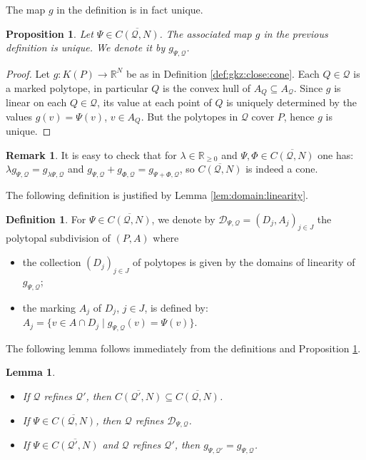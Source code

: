 \documentclass[12pt, a4article]{amsart}   	%
\numberwithin{equation}{section}
\theoremstyle{plain}
\newtheorem{proposition}[theorem]{Proposition}
\newtheorem{lemma}[theorem]{Lemma}
\theoremstyle{definition}
\newtheorem{remark}[theorem]{Remark}
\newtheorem{definition}[theorem]{Definition}
\newcommand{\R}{{\mathbb R}}
\newcommand{\mcD}{{\mathcal D}}
\newcommand{\mcQ}{{\mathcal Q}}
\begin{document}
The map $g$ in the definition is in fact unique.

\begin{proposition}\label{prp:unique:Q-linear}
Let $\Psi\in\overline{C(\mcQ,N)}$. The associated map $g$ in the previous definition is unique. 
We denote it by $g_{\Psi,\mcQ}$.
\end{proposition}

\begin{proof} 
Let $g:K(P)\to\R^N$ be as in Definition \ref{def:gkz:close:cone}. Each $Q\in\mcQ$ is a marked polytope, in particular $Q$ is the convex hull of $A_Q\subseteq A_\mcQ$. Since $g$ is linear on each $Q\in\mcQ$, its value at each point of $Q$ is uniquely determined by the values $g(v) = \Psi(v)$, 
$v\in A_Q$. But the polytopes in $\mcQ$ cover $P$, hence $g$ is unique.
\end{proof}
\begin{remark}\rm
It is easy to check that for $\lambda\in\mathbb R_{\ge 0}$
and $\Psi,\Phi\in \overline{C(\mcQ,N)}$ one has: $\lambda g_{\Psi,\mcQ}=g_{\lambda\Psi,\mcQ}$
and $g_{\Psi,\mcQ}+g_{\Phi,\mcQ}=g_{\Psi+\Phi,\mcQ}$, so $ \overline{C(\mcQ,N)}$ is indeed a cone.
\end{remark}
The following definition is justified by Lemma \ref{lem:domain:linearity}.

\begin{definition}\label{def:subdivision:matrix}
For $\Psi\in\overline{C(\mcQ,N)}$, we denote by $\mcD_{\Psi,\mcQ}=(D_{j},A_{j})_{j\in J}$ the 
    polytopal subdivision of $(P,A)$ where
    \begin{itemize}
    \item[-] the collection $(D_j)_{j\in J}$ of polytopes  is given by the domains of linearity of $g_{\Psi,\mcQ}$; 
    \item[-] the marking $A_j$ of $D_j$, $j\in J$, is defined by: $A_j=\{ v\in A\cap D_j\mid g_{\Psi,\mcQ}(v) = \Psi(v)\}$.
    \end{itemize}
\end{definition}

The following lemma follows immediately from the definitions and Proposition \ref{prp:unique:Q-linear}.

\begin{lemma}\label{lem:Q:refine}
    \begin{itemize}
        \item[\rm (i)] If $\mcQ$ refines $\mcQ'$, then $\overline{C(\mcQ',N)}\subseteq\overline{C(\mcQ,N)}$.
        \item[\rm (ii)] If $\Psi\in\overline{C(\mcQ,N)}$, then $\mcQ$ refines $\mcD_{\Psi,\mcQ}$.
        \item[\rm (iii)] If $\Psi\in\overline{C(\mcQ',N)}$ and $\mcQ$ refines $\mcQ'$, then $g_{\Psi,\mcQ'} = g_{\Psi,\mcQ}$.
    \end{itemize}
\end{lemma}
\end{document}
